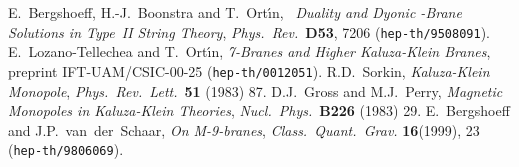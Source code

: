 \documentclass[12pt,a4paper]{article}
\begin{document}
\begin{thebibliography}{50}
%
 E.~Bergshoeff, H.-J.~Boonstra and T.~Ort\'{\i}n,
        {\sl {}\coordHE{}~Duality and Dyonic \coordHE{}-Brane Solutions
             in Type~II String Theory},
        {\it Phys.~Rev.}~{\bf D53}, 7206 ({\tt hep-th/9508091}).
%
 E.~Lozano-Tellechea and T.~Ort\'{\i}n,
        {\sl 7-Branes and Higher Kaluza-Klein Branes},
        preprint IFT-UAM/CSIC-00-25 ({\tt hep-th/0012051}).
%
 R.D.~Sorkin, 
        {\sl Kaluza-Klein Monopole},
        {\it Phys.~Rev.~Lett.}~{\bf 51} (1983) 87.
%
  D.J.~Gross and M.J.~Perry, 
        {\sl Magnetic Monopoles in Kaluza-Klein Theories},
        {\it Nucl.~Phys.}~{\bf B226} (1983) 29.
%
 E.~Bergshoeff and J.P.~van~der~Schaar,
        {\sl On M-9-branes},
        {\it Class.~Quant.~Grav.} {\bf 16}(1999), 23
        ({\tt hep-th/9806069}).

\end{thebibliography}
\end{document}
